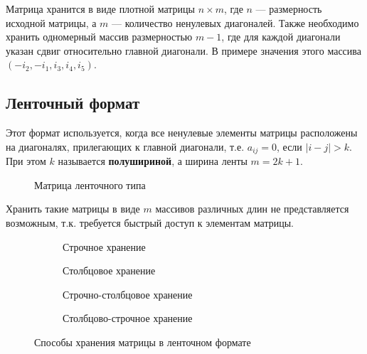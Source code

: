 Матрица хранится в виде плотной матрицы \(n \times m\), где \(n\) --- размерность исходной матрицы, а \(m\) --- количество ненулевых диагоналей. Также необходимо хранить одномерный массив размерностью \(m - 1\), где для каждой диагонали указан сдвиг относительно главной диагонали. В примере значения этого массива \(( - i_2, - i_1, i_3, i_4, i_5)\).

\subsection{Ленточный формат}

Этот формат используется, когда все ненулевые элементы матрицы расположены на диагоналях, прилегающих к главной диагонали, т.е. \(a_{ij} = 0\), если \(|i - j| > k\). При этом \(k\) называется \textbf{полушириной}, а ширина ленты \(m = 2k + 1\).

\begin{figure}[h]
    \centering
    
    \caption{Матрица ленточного типа}
\end{figure}

Хранить такие матрицы в виде \(m\) массивов различных длин не представляется возможным, т.к. требуется быстрый доступ к элементам матрицы.

\begin{figure}[h]
    \begin{subfigure}[t]{.5\textwidth}
        \centering
        
        \caption{Строчное хранение}
    \end{subfigure}
    \hfill
    \begin{subfigure}[t]{.5\textwidth}
        \centering
        
        \caption{Столбцовое хранение}
    \end{subfigure}
    \hfill

    \medskip

    \begin{subfigure}[t]{.5\textwidth}
        \centering
        
        \caption{Строчно-столбцовое хранение}
    \end{subfigure}
    \hfill
    \begin{subfigure}[t]{.5\textwidth}
        \centering
        
        \caption{Столбцово-строчное хранение}
    \end{subfigure}
    \hfill
    \caption{Способы хранения матрицы в ленточном формате}
\end{figure}


